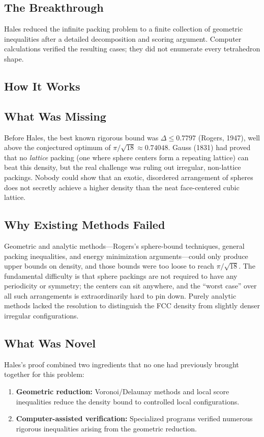 \subsection{The Breakthrough}
Hales reduced the infinite packing problem to a finite collection of geometric inequalities after a detailed decomposition and scoring argument. Computer calculations verified the resulting cases; they did not enumerate every tetrahedron shape.

\subsection{How It Works}

\subsection{What Was Missing}
Before Hales, the best known rigorous bound was $\Delta \leq 0.7797$ (Rogers, 1947), well above the conjectured optimum of $\pi/\sqrt{18} \approx 0.74048$. Gauss (1831) had proved that no \emph{lattice} packing (one where sphere centers form a repeating lattice) can beat this density, but the real challenge was ruling out irregular, non-lattice packings. Nobody could show that an exotic, disordered arrangement of spheres does not secretly achieve a higher density than the neat face-centered cubic lattice.

\subsection{Why Existing Methods Failed}
Geometric and analytic methods---Rogers's sphere-bound techniques, general packing inequalities, and energy minimization arguments---could only produce upper bounds on density, and those bounds were too loose to reach $\pi/\sqrt{18}$. The fundamental difficulty is that sphere packings are not required to have any periodicity or symmetry; the centers can sit anywhere, and the ``worst case'' over all such arrangements is extraordinarily hard to pin down. Purely analytic methods lacked the resolution to distinguish the FCC density from slightly denser irregular configurations.

\subsection{What Was Novel}
Hales's proof combined two ingredients that no one had previously brought together for this problem:
\begin{enumerate}
\item \textbf{Geometric reduction:} Voronoi/Delaunay methods and local score inequalities reduce the density bound to controlled local configurations.
\item \textbf{Computer-assisted verification:} Specialized programs verified numerous rigorous inequalities arising from the geometric reduction.
\end{enumerate}

